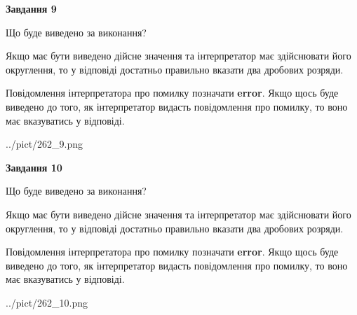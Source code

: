 \documentclass[12pt, ukrainian]{article}
\begin{document}
{\begin {Large}
{\begin {center}\textbf{Завдання 9}\end {center}}\par
Що буде виведено за виконання? \par

Якщо має бути виведено дійсне значення та інтерпретатор має здійснювати його округлення, 
то у відповіді достатньо правильно вказати два дробових розряди.

Повідомлення інтерпретатора про помилку позначати \textbf{error}.
Якщо щось буде виведено до того, як інтерпретатор видасть повідомлення про помилку, 
то воно має вказуватись у відповіді. \par

\begin{center}
	{../pict/262_9.png}
\end{center}
\newpage

{\begin {center}\textbf{Завдання 10}\end {center}}\par
Що буде виведено за виконання? \par

Якщо має бути виведено дійсне значення та інтерпретатор має здійснювати його округлення, 
то у відповіді достатньо правильно вказати два дробових розряди.

Повідомлення інтерпретатора про помилку позначати \textbf{error}.
Якщо щось буде виведено до того, як інтерпретатор видасть повідомлення про помилку, 
то воно має вказуватись у відповіді. \par

\begin{center}
	{../pict/262_10.png}
\end{center}
\newpage

\end {Large}}
\end{document}
